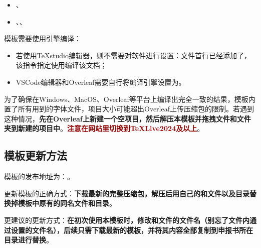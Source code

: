 \documentclass[QingNianC, vlined, timesmathnogreek]{nsfc}
\begin{document}
	\begin{itemize}
		\item \href{https://zhuanlan.zhihu.com/p/389394015}{\color{DarkRed}}、\href{https://blog.csdn.net/ChrisP_333/article/details/82943508}{\color{DarkRed}}
		\item \href{https://code.visualstudio.com/Download}{\color{DarkRed}}、\href{https://zhuanlan.zhihu.com/p/166523064}{\color{DarkRed}}、\href{https://texstudio.sourceforge.net/#download}{\color{DarkRed}}
	\end{itemize}
	
	模板需要使用引擎编译：
	\begin{itemize}
		\item 若使用TeXstudio编辑器，则不需要对软件进行设置：文件首行已经添加了，该指令指定使用编译该文档；
		
		\item VSCode编辑器和Overleaf需要自行将编译引擎设置为。
	\end{itemize}
	

	为了确保在Windows、MacOS、Overleaf等平台上编译出完全一致的结果，模板内置了所有用到的字体文件，项目大小可能超出Overleaf上传压缩包的限制。若遇到这种情况，\textbf{先在Overleaf上新建一个空项目，然后解压本模板并拖拽文件和文件夹到新建的项目中}。\textcolor{DarkRed}{\textbf{注意在网站里切换到TeXLive2024及以上}}。

	\subsection{模板更新方法}

	模板的发布地址为：\href{https://github.com/MGG1996/NSFC}{\color{DarkRed}}。
	
	更新模板的正确方式：\textbf{下载最新的完整压缩包，解压后用自己的和文件以及目录替换掉模板中原有的同名文件和目录}。

	更建议的更新方式：\textbf{\color{DarkRed}在初次使用本模板时，修改和文件的文件名（别忘了文件内通过设置的文件名），后续只需下载最新的模板，并将其内容全部复制到申报书所在目录进行替换}。
\end{document}
